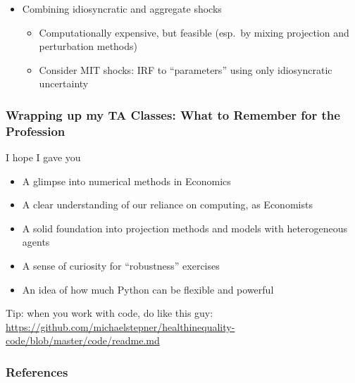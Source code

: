 \documentclass[10pt, aspectratio=1610, natbib, handout]{beamer}
\begin{document}
\begin{frame}
\begin{itemize}
\begin{itemize}
        \end{itemize}
      \vfill\pause
      \item Combining idiosyncratic and aggregate shocks
        \begin{itemize}
          \item Computationally expensive, but feasible (esp.~by mixing projection and perturbation methods)
          \item Consider MIT shocks: IRF to ``parameters'' using only idiosyncratic uncertainty
        \end{itemize}
    \end{itemize}

  \end{frame}

  \begin{frame}
    \frametitle{Wrapping up my TA Classes: What to Remember for the Profession}

    I hope I gave you

    \vfill\pause

    \begin{itemize}
      \item A glimpse into numerical methods in Economics
      \vfill\pause
      \item A clear understanding of our reliance on computing, as Economists
      \vfill\pause
      \item A solid foundation into projection methods and models with heterogeneous agents
      \vfill\pause
      \item A sense of curiosity for ``robustness'' exercises
      \vfill\pause
      \item An idea of how much Python can be flexible and powerful
    \end{itemize}

    \vfill\pause

    Tip: when you work with code, do like this guy: \url{https://github.com/michaelstepner/healthinequality-code/blob/master/code/readme.md}

  \end{frame}

  \appendix

  \begin{frame}
    \frametitle{References}

    
    

  \end{frame}
\end{document}
